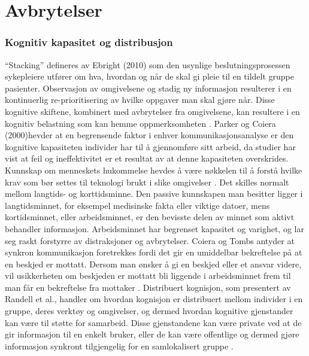 \section{Avbrytelser}
\label{chp: avbrytelser} 

\subsubsection{Kognitiv kapasitet og distribusjon}
“Stacking” defineres av Ebright (2010) som den usynlige beslutningsprosessen sykepleiere utfører om hva, hvordan og når de skal gi pleie til en tildelt gruppe pasienter. Observasjon av omgivelsene og stadig ny informasjon resulterer i en kontinuerlig re-prioritisering av hvilke oppgaver man skal gjøre når. Disse kognitive skiftene, kombinert med avbrytelser fra omgivelsene, kan resultere i en kognitiv belastning som kan hemme oppmerksomheten \cite{Ebright10}. Parker og Coiera (2000)hevder at en begrensende faktor i enhver kommunikasjonsanalyse er den kognitive kapasiteten individer har til å gjennomføre sitt arbeid, da studier har vist at feil og ineffektivitet er et resultat av at denne kapasiteten overskrides. Kunnskap om menneskets hukommelse hevdes å være nøkkelen til å forstå hvilke krav som bør settes til teknologi brukt i slike omgivelser \cite{Parker00}.
Det skilles normalt mellom langtids- og korttidsminne. Den passive kunnskapen man besitter ligger i langtidsminnet, for eksempel medisinske fakta eller viktige datoer, mens kortidsminnet, eller arbeidsminnet, er den bevisste delen av minnet som aktivt behandler informasjon. Arbeidsminnet har begrenset kapasitet og varighet, og lar seg raskt forstyrre av distraksjoner og avbrytelser. Coiera og Tombs antyder at synkron kommunikasjon foretrekkes fordi det gir en umiddelbar bekreftelse på at en beskjed er mottatt. Dersom man ønsker å gi en beskjed eller et ansvar videre, vil usikkerheten om beskjeden er mottatt bli liggende i arbeidsminnet frem til man får en bekreftelse fra mottaker \cite{Parker00}. 
Distribuert kognisjon, som presentert av Randell et al., handler om hvordan kognisjon er distribuert mellom individer i en gruppe, deres verktøy og omgivelser, og dermed hvordan kognitive gjenstander kan være til støtte for samarbeid. Disse gjenstandene kan være private ved at de gir informasjon til en enkelt bruker, eller de kan være offentlige og dermed gjøre informasjon synkront tilgjengelig for en samlokalisert gruppe \cite{Randell}.  

